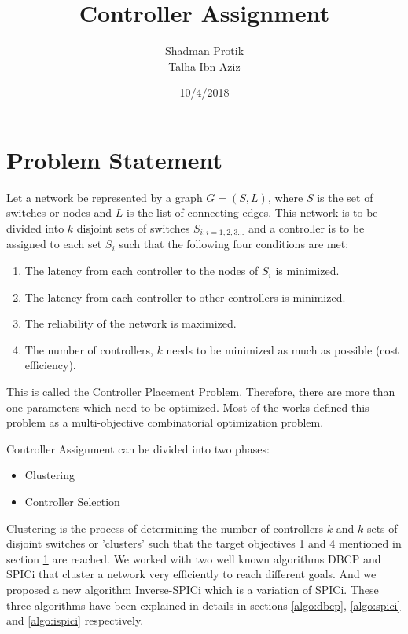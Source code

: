\documentclass[10pt]{extarticle}
\begin{document}
	
	\twocolumn
	
	\title{Controller Assignment}
	\author{Shadman Protik\\Talha Ibn Aziz }
	\date{10/4/2018}
	\maketitle
	
	\section{Problem Statement} \label{prob}
	Let a network be represented by a graph $G=(S,L)$, where $S$ is the set of switches or nodes and $L$ is the list of connecting edges. This network is to be divided into $k$ disjoint sets of switches $S_{i:i=1,2,3...}$ and a controller is to be assigned to each set $S_i$ such that the following four conditions are met:
	\begin{enumerate}
		\item The latency from each controller to the nodes of $S_i$ is minimized.
		\item The latency from each controller to other controllers is minimized.
		\item The reliability of the network is maximized.
		\item The number of controllers, $k$ needs to be minimized as much as possible (cost efficiency). 
	\end{enumerate}
	
	This is called the Controller Placement Problem.
	Therefore, there are more than one parameters which need to be optimized. Most of the works\cite{dbcp} defined this problem as a multi-objective combinatorial optimization problem.
	
	Controller Assignment can be divided into two phases:
	\begin{itemize}
		\item Clustering
		\item Controller Selection
	\end{itemize}
	
	Clustering is the process of determining the number of controllers $k$ and $k$ sets of disjoint switches or 'clusters' such that the target objectives 1 and 4 mentioned in section \ref{prob} are reached. We worked with two well known algorithms DBCP\cite{dbcp} and SPICi\cite{spici} that cluster a network very efficiently to reach different goals. And we proposed a new algorithm Inverse-SPICi which is a variation of SPICi. These three algorithms have been explained in details in sections \ref{algo:dbcp}, \ref{algo:spici} and \ref{algo:ispici} respectively.
	
\end{document}
